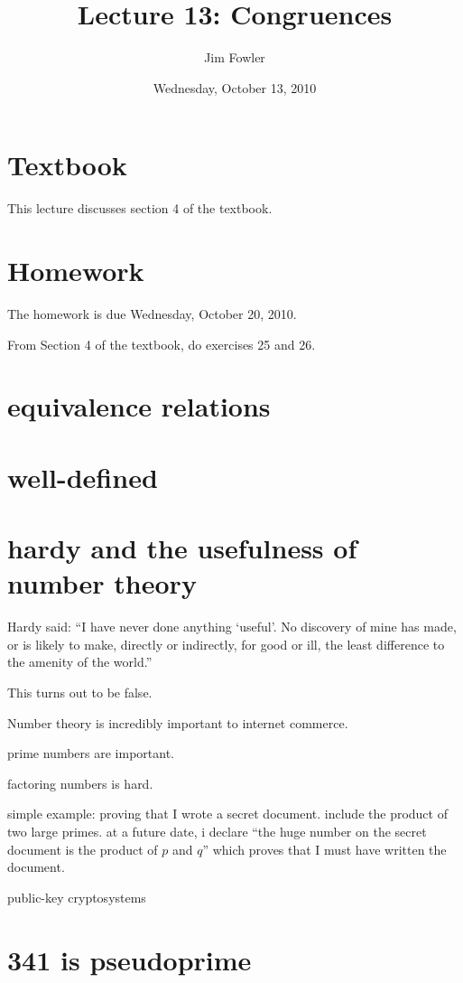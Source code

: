 \documentclass[12pt]{handout}
\title{Lecture 13: Congruences}
\author{Jim Fowler}
\date{Wednesday, October 13, 2010}
\begin{document}
\maketitle

\section*{Textbook}

This lecture discusses section 4 of the textbook.

\section*{Homework} 

The homework is due Wednesday, October 20, 2010.

From Section 4 of the textbook, do exercises 25 and 26.

\section*{equivalence relations}

\section*{well-defined}

\section*{hardy and the usefulness of number theory}

Hardy said: ``I have never done anything `useful'. No discovery of mine has made,
or is likely to make, directly or indirectly, for good or ill, the
least difference to the amenity of the world.''

This turns out to be false.

Number theory is incredibly important to internet commerce.

prime numbers are important.

factoring numbers is hard.

simple example: proving that I wrote a secret document.  include the
product of two large primes.  at a future date, i declare ``the huge
number on the secret document is the product of $p$ and $q$'' which
proves that I must have written the document.

public-key cryptosystems

\section*{341 is pseudoprime}
\end{document}
